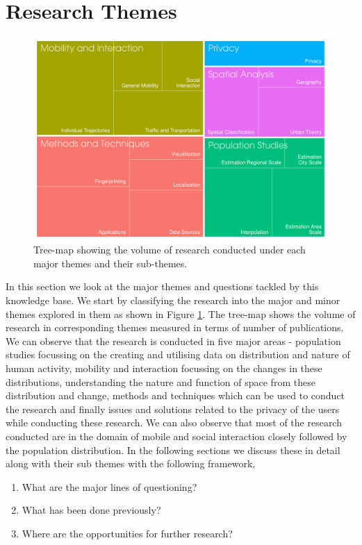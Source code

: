 \section{Research Themes}

\begin{figure}
  \includegraphics{images/literature-themes-treemap.png}
  \caption{Tree-map showing the volume of research conducted under each major themes and their sub-themes.}
  \label{figure:literature:themes}
\end{figure}

In this section we look at the major themes and questions tackled by this knowledge base.
We start by classifying the research into the major and minor themes explored in them as shown in Figure \ref{figure:literature:themes}.
The tree-map shows the volume of research in corresponding themes measured in terms of number of publications.
We can observe that the research is conducted in five major areas - population studies focussing on the creating and utilising data on distribution and nature of human activity, mobility and interaction focussing on the changes in these distributions, understanding the nature and function of space from these distribution and change, methods and techniques which can be used to conduct the research and finally issues and solutions related to the privacy of the users while conducting these research.
We can also observe that most of the research conducted are in the domain of mobile and social interaction closely followed by the population distribution.
In the following sections we discuss these in detail along with their sub themes with the following framework,

\begin{enumerate}
  \setlength{\itemindent}{2em}
  \itemsep-0.25em
  \item What are the major lines of questioning?
  \item What has been done previously?
  \item Where are the opportunities for further research?
\end{enumerate}

